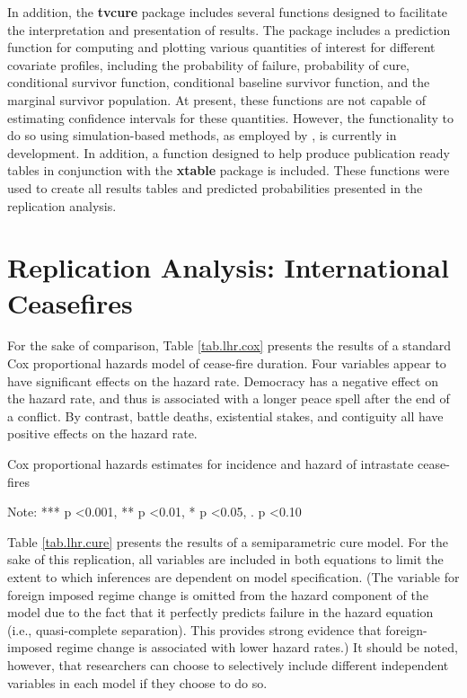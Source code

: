In addition, the \textbf{tvcure} package includes several functions designed to facilitate the interpretation and presentation of results. The package includes a prediction function for computing and plotting various quantities of interest for different covariate profiles, including the probability of failure, probability of cure, conditional survivor function, conditional baseline survivor function, and the marginal survivor population. At present, these functions are not capable of estimating confidence intervals for these quantities. However, the functionality to do so using simulation-based methods, as employed by \citet{beger2017}, is currently in development. In addition, a function designed to help produce publication ready tables in conjunction with the \textbf{xtable} package is included. These functions were used to create all results tables and predicted probabilities presented in the replication analysis.


\section{Replication Analysis: International Ceasefires}

For the sake of comparison, Table \ref{tab.lhr.cox} presents the results of a standard Cox proportional hazards model of cease-fire duration. Four variables appear to have significant effects on the hazard rate. Democracy has a negative effect on the hazard rate, and thus is associated with a longer peace spell after the end of a conflict. By contrast, battle deaths, existential stakes, and contiguity all have positive effects on the hazard rate.

\begin{table}
	\caption{Cox proportional hazards estimates for incidence and hazard of intrastate cease-fires} 
	\label{tab.lhr.cox}
	
	Note: *** p \textless 0.001, ** p \textless 0.01, * p \textless 0.05, . p \textless 0.10
\end{table}

Table \ref{tab.lhr.cure} presents the results of a semiparametric cure model. For the sake of this replication, all variables are included in both equations to limit the extent to which inferences are dependent on model specification. (The variable for foreign imposed regime change is omitted from the hazard component of the model due to the fact that it perfectly predicts failure in the hazard equation (i.e., quasi-complete separation). This provides strong evidence that foreign-imposed regime change is associated with lower hazard rates.) It should be noted, however, that researchers can choose to selectively include different independent variables in each model if they choose to do so. 

